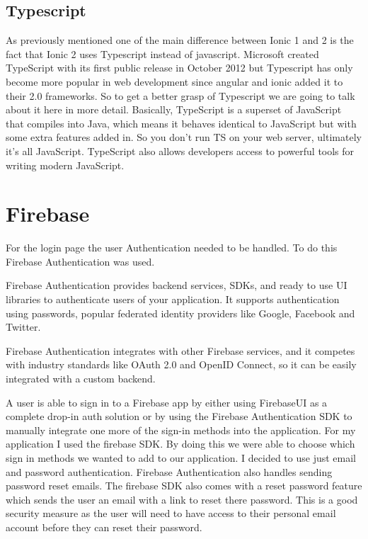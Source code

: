 \subsection {Typescript}
As previously mentioned one of the main difference between Ionic 1 and 2 is the fact that Ionic 2 uses Typescript instead of javascript. Microsoft created TypeScript with its first public release in October 2012 but Typescript has only become more popular in web development since angular and ionic added it to their 2.0 frameworks. So to get a better grasp of Typescript we are going to talk about it here in more detail.
Basically, TypeScript is a superset of JavaScript that compiles into Java, which means it behaves identical to JavaScript but with some extra features added in. So you don't run TS on your web server, ultimately it’s all JavaScript. TypeScript also allows developers access to powerful tools for writing modern JavaScript.\cite{typescript} \cite{typescript2}



\section{Firebase}

For the login page the user Authentication needed to be handled. To do this Firebase Authentication was used. 

Firebase Authentication provides backend services, SDKs, and ready to use UI libraries to authenticate users of your application. It supports authentication using passwords, popular federated identity providers like Google, Facebook and Twitter.\cite{firebaseauth}

Firebase Authentication integrates with other Firebase services, and it competes with industry standards like OAuth 2.0 and OpenID Connect, so it can be easily integrated with a custom backend. 

A user is able to sign in to a Firebase app by either using FirebaseUI as a complete drop-in auth solution or by using the Firebase Authentication SDK to manually integrate one more of the  sign-in methods into the application. For my application I used the firebase SDK. By doing this we were able to choose which sign in methods we wanted to add to our application. I decided to use just email and password authentication. 
Firebase Authentication also handles sending password reset emails. The firebase SDK also comes with a reset password feature which sends the user an email with a link to reset there password. This is a good security measure as the user will need to have access to their personal email account before they can reset their password.\cite{firebase}
